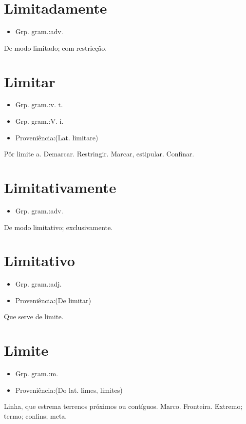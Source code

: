 \section{Limitadamente}
\begin{itemize}
\item {Grp. gram.:adv.}
\end{itemize}
De modo limitado; com restricção.
\section{Limitar}
\begin{itemize}
\item {Grp. gram.:v. t.}
\end{itemize}
\begin{itemize}
\item {Grp. gram.:V. i.}
\end{itemize}
\begin{itemize}
\item {Proveniência:(Lat. \textunderscore limitare\textunderscore )}
\end{itemize}
Pôr limite a.
Demarcar.
Restringir.
Marcar, estipular.
Confinar.
\section{Limitativamente}
\begin{itemize}
\item {Grp. gram.:adv.}
\end{itemize}
De modo limitativo; exclusivamente.
\section{Limitativo}
\begin{itemize}
\item {Grp. gram.:adj.}
\end{itemize}
\begin{itemize}
\item {Proveniência:(De \textunderscore limitar\textunderscore )}
\end{itemize}
Que serve de limite.
\section{Limite}
\begin{itemize}
\item {Grp. gram.:m.}
\end{itemize}
\begin{itemize}
\item {Proveniência:(Do lat. \textunderscore limes\textunderscore , \textunderscore limites\textunderscore )}
\end{itemize}
Linha, que estrema terrenos próximos ou contíguos.
Marco.
Fronteira.
Extremo; termo; confins; meta.
